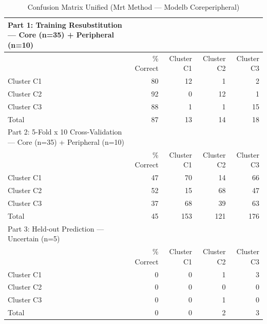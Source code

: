 \begin{table}[htbp]
  \centering
  \caption{Confusion Matrix Unified (Mrt Method — Modelb Coreperipheral)}
  \label{tab:MRT_Method_ModelB_CorePeripheral_tables_confusion_matrix_unified}
  \begin{tabular}{lrrrr}
    \toprule
    Part 1: Training Resubstitution — Core (n=35) + Peripheral (n=10) &  &  &  &  \\
    \midrule
     & \% Correct & Cluster C1 & Cluster C2 & Cluster C3 \\
    Cluster C1 & 80 & 12 & 1 & 2 \\
    Cluster C2 & 92 & 0 & 12 & 1 \\
    Cluster C3 & 88 & 1 & 1 & 15 \\
    Total & 87 & 13 & 14 & 18 \\
    Part 2: 5-Fold x 10 Cross-Validation — Core (n=35) + Peripheral (n=10) &  &  &  &  \\
     & \% Correct & Cluster C1 & Cluster C2 & Cluster C3 \\
    Cluster C1 & 47 & 70 & 14 & 66 \\
    Cluster C2 & 52 & 15 & 68 & 47 \\
    Cluster C3 & 37 & 68 & 39 & 63 \\
    Total & 45 & 153 & 121 & 176 \\
    Part 3: Held-out Prediction — Uncertain (n=5) &  &  &  &  \\
     & \% Correct & Cluster C1 & Cluster C2 & Cluster C3 \\
    Cluster C1 & 0 & 0 & 1 & 3 \\
    Cluster C2 & 0 & 0 & 0 & 0 \\
    Cluster C3 & 0 & 0 & 1 & 0 \\
    Total & 0 & 0 & 2 & 3 \\
    \bottomrule
  \end{tabular}
\end{table}
